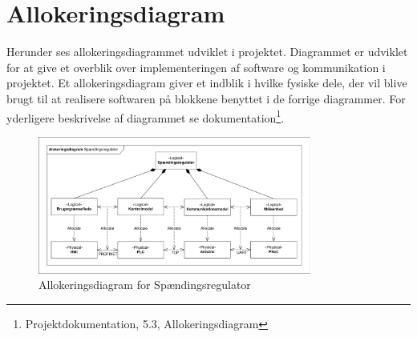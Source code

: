 

\section{Allokeringsdiagram}

Herunder ses allokeringsdiagrammet udviklet i projektet. Diagrammet er udviklet for at give et overblik over implementeringen af software og kommunikation i projektet. Et allokeringsdiagram giver et indblik i hvilke fysiske dele, der vil blive brugt til at realisere softwaren på blokkene benyttet i de forrige diagrammer. For yderligere beskrivelse af diagrammet se dokumentation\footnote{Projektdokumentation, 5.3, Allokeringsdiagram}.


\begin{figure}[htbp] %
	\centering
	\includegraphics[width=0.8\textwidth]{figure/Allokering.pdf}
	\caption{Allokeringsdiagram for Spændingsregulator}
	\label{fig:Allokering}
\end{figure}
